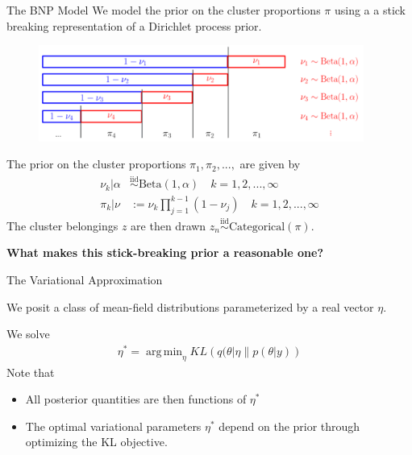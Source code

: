 \documentclass[10pt]{beamer}\usepackage[]{graphicx}\usepackage[]{color}
\DeclareMathOperator*{\argmin}{arg\,min}
\begin{document}
\begin{frame}{The BNP Model}
We model the prior on the cluster proportions $\pi$ using a
a stick breaking representation of a Dirichlet process prior.
\vspace{-0.2in}
\begin{figure}[!h]
\centering
\includegraphics[width = 0.95\textwidth]{./figures/DP_stick_breaking.png}
\end{figure}
\vspace{-0.1in}
The prior on the cluster proportions $\pi_1, \pi_2, ..., $ are given by
%
\begin{align*}
\nu_k \vert \alpha &\overset{\text{iid}}{\sim} \text{Beta}\left(1, \alpha \right)\quad k = 1, 2, ..., \infty \\
\pi_k | \nu &:= \nu_k \prod_{j=1}^{k-1} (1 - \nu_j) \quad k = 1, 2, ..., \infty
\end{align*}
%
The cluster belongings $z$ are then drawn 
$z_n\overset{\text{iid}}{\sim} \mathrm{Categorical}(\pi)$. 

\pause 

\begin{mdframed}[style=MyFrame]
\begin{center}
{\bf What makes this stick-breaking prior a reasonable one?}
\end{center}
\end{mdframed}

\end{frame}

\begin{frame}{The Variational Approximation}

We posit a class of mean-field distributions parameterized by a real vector $\eta$. 

We solve
\begin{align*}
  \eta^* = \argmin_{\eta} KL\left(
      q(\theta \vert \eta \big\| p(\theta | y)
      \right)
\end{align*}
%
Note that 

\begin{itemize}
\item All posterior quantities are then functions of $\eta^*$
\item The optimal variational parameters $\eta^*$ depend on the prior through optimizing the KL objective. 
\end{itemize}

\end{frame}
\end{document}
